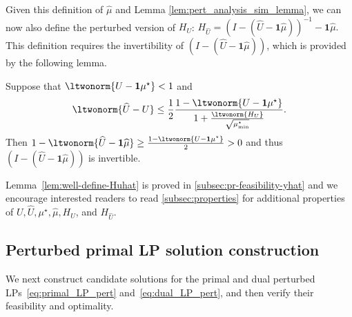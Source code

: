 \documentclass[mnsc,nonblindrev]{informs3}
\newcommand{\one}{\mathbf{1}}
\newcommand{\muhat}{\widehat{\mu}}
\newcommand{\uhat}{\widehat{U}}
\begin{document}
Given this definition of $\muhat$ and Lemma \ref{lem:pert_analysis_sim_lemma}, we can now also define the perturbed version of $H_U$: $H_{\uhat} = (I - (\uhat - \one \muhat))^{-1} - \one \muhat.$
This definition requires the invertibility of $(I - (\uhat - \one \muhat))$, which is provided by the following lemma.
\begin{lemma}
\label{lem:well-define-Huhat}
    Suppose that $\ltwonorm{U - \one \mu^\star} < 1$ and 
    \begin{equation}
        \ltwonorm{ \uhat-U} \leq \frac{1}{2}\frac{1 - \ltwonorm{U - \one \mu^\star}}{1 + \frac{\ltwonorm{H_{U}}}{\sqrt{\mu^\star_{\min}}} }. \label{eq:well-define-Huhat}
    \end{equation}
    Then
    $
        1-\ltwonorm{\uhat - \one \muhat} \geq \frac{1-\ltwonorm{U - \one \mu^\star}}{2} > 0
    $
    and thus $(I - (\uhat - \one \muhat))$ is invertible.
\end{lemma}
Lemma~\ref{lem:well-define-Huhat} is proved in \ref{subsec:pr-feasibility-yhat} and we encourage interested readers to read \ref{subsec:properties} for additional properties of  $U, \uhat, \mu^\star, \muhat, H_U$, and $H_{\uhat}$. 

\subsection{Perturbed primal LP solution construction}
\label{sec:pert_subsec_2}
We next construct candidate solutions for the primal and dual perturbed
LPs~\eqref{eq:primal_LP_pert} and~\eqref{eq:dual_LP_pert}, and then verify
their feasibility and optimality.
\end{document}

